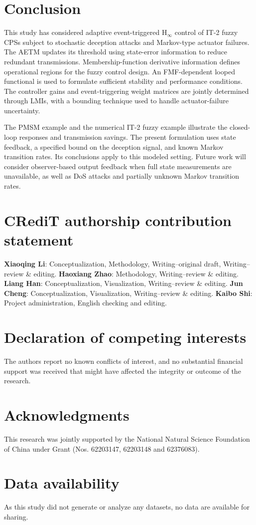 \documentclass[preprint,review,fleqn,sort&compress,3p]{elsarticle}
\theoremstyle{definition} %
\theoremstyle{definition}%
\begin{document}
\section{Conclusion} \label{sec5}
This study has considered adaptive event-triggered $\mathrm{H}_{\infty}$ control of IT-2 fuzzy CPSs subject to stochastic deception attacks and Markov-type actuator failures. The AETM updates its threshold using state-error information to reduce redundant transmissions. Membership-function derivative information defines operational regions for the fuzzy control design. An FMF-dependent looped functional is used to formulate sufficient stability and performance conditions. The controller gains and event-triggering weight matrices are jointly determined through LMIs, with a bounding technique used to handle actuator-failure uncertainty.

The PMSM example and the numerical IT-2 fuzzy example illustrate the closed-loop responses and transmission savings. The present formulation uses state feedback, a specified bound on the deception signal, and known Markov transition rates. Its conclusions apply to this modeled setting. Future work will consider observer-based output feedback when full state measurements are unavailable, as well as DoS attacks and partially unknown Markov transition rates.


\section*{CRediT authorship contribution statement}
{\bf Xiaoqing Li}: Conceptualization, Methodology, Writing--original draft, Writing--review \& editing. %
{\bf Haoxiang Zhao}: Methodology, Writing--review \& editing. 
{\bf Liang Han}: Conceptualization, Visualization, Writing--review \& editing.
{\bf Jun Cheng}: Conceptualization, Visualization, Writing--review \& editing. 
{\bf Kaibo Shi}: Project administration, English checking and editing. 
\section*{Declaration of competing interests}
The authors report no known conflicts of interest, and no substantial financial support was received that might have affected the integrity or outcome of the research.

\section*{Acknowledgments}
This research was jointly supported by the National Natural Science Foundation of China under Grant (Nos. 62203147, 62203148 and 62376083).
\section*{Data availability}
As this study did not generate or analyze any datasets, no data are available for sharing.

 
 
\end{document}
